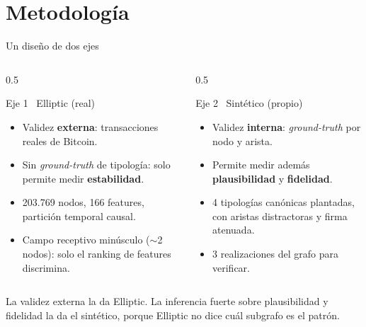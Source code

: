 \documentclass[aspectratio=169,11pt]{beamer}
\begin{document}
\section{Metodología}

\begin{frame}{Un diseño de dos ejes}
\begin{columns}[T]
\begin{column}{0.5\textwidth}
\begin{block}{Eje 1 \textperiodcentered\ Elliptic (real)}
\begin{itemize}\small
  \item Validez \textbf{externa}: transacciones reales de Bitcoin.
  \item Sin \emph{ground-truth} de tipología: solo permite medir \textbf{estabilidad}.
  \item 203.769 nodos, 166 features, partición temporal causal.
  \item Campo receptivo minúsculo ($\sim$2 nodos): solo el ranking de features discrimina.
\end{itemize}
\end{block}
\end{column}
\begin{column}{0.5\textwidth}
\begin{block}{Eje 2 \textperiodcentered\ Sintético (propio)}
\begin{itemize}\small
  \item Validez \textbf{interna}: \emph{ground-truth} por nodo y arista.
  \item Permite medir además \textbf{plausibilidad} y \textbf{fidelidad}.
  \item 4 tipologías canónicas plantadas, con aristas distractoras y firma atenuada.
  \item 3 realizaciones del grafo para verificar.
\end{itemize}
\end{block}
\end{column}
\end{columns}
\vspace{0.3em}
{\footnotesize\color{muted} La validez externa la da Elliptic. La inferencia fuerte sobre plausibilidad y fidelidad la da el sintético, porque Elliptic no dice cuál subgrafo es el patrón.}
\end{frame}
\end{document}
